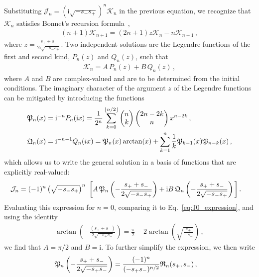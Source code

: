 \documentclass[prd,superscriptaddress,preprintnumbers,tightenlines,nofootinbib, eqsecnum]{revtex4-2}
\newcommand{\di}{\mathrm{i}}
\begin{document}
Substituting $\mathcal{J}_n = \left(\di \sqrt{-s_- s_+}\right)^n \mathcal{K}_n$ in the previous equation, we recognize that $\mathcal{K}_n$ satisfies Bonnet's recursion formula~\cite{Bonnet:these},
\begin{align}
    (n+1) \mathcal{K}_{n+1}= (2n+1) z \mathcal{K}_n - n \mathcal{K}_{n-1} \,,
\end{align}
where $z = \frac{s_+ + s_-}{2\di \sqrt{-s_- s_+}}$. Two independent solutions are the Legendre functions of the first and second kind, $P_n(z)$ and $Q_n(z)$, such that 
\begin{align}
    \mathcal{K}_n  = A \,P_n(z) + B \, Q_n(z) \,,
\end{align}
where $A$ and $B$ are complex-valued and are to be determined from the initial conditions. The imaginary character of the argument $z$ of the Legendre functions can be mitigated by introducing the functions
\begin{align}
    \frak{P}_n(x) &= \di^{-n} P_n(\di x) = \frac{1}{2^n} \sum_{k=0}^{\lfloor n/2 \rfloor} \begin{pmatrix}
        n\\k
    \end{pmatrix} \begin{pmatrix}
        2n-2k\\n
    \end{pmatrix}
    x^{n-2k} \,,\\
    \frak{Q}_n(x) &= \di^{-n-1} Q_n(ix) = \frak{P}_n(x) \arctan(x) + \sum_{k=1}^{n} \frac{1}{k} \frak{P}_{k-1}(x) \frak{P}_{n-k}(x) \,,
\end{align}
which allows us to write the general solution in a basis of functions that are explicitly real-valued:
\begin{align}\label{eq:cal_Jn_of_frak_Pn_Qn}
    \mathcal{J}_n &= (-1)^n\left( \sqrt{-s_- s_+}\right)^n\ \bigg[A \,    \frak{P}_n\left(- \frac{s_+ + s_-}{2 \sqrt{-s_- s_+}} \right)+ \di B \,   \frak{Q}_n\left(- \frac{s_+ + s_-}{2 \sqrt{-s_- s_+}} \right)\bigg] \,.
\end{align}
Evaluating this expression for $n=0$, comparing it to Eq.~\eqref{eq:J0_expression}, and using the identity
\begin{align}\label{eq:arctan_identity}
    \arctan\left(-\frac{(s_+ + s_-)}{2\sqrt{-s_+ s_-}}\right) = \frac{\pi}{2} - 2 \arctan\left(\sqrt{\frac{s_+}{-s_-}}\right) \,,
\end{align}
we find that 
$A = \pi/2$ and $B=\di $. To further simplify the expression, we then write
\begin{align}\label{eq:frak_Pn_of_frak_Rn}
    \frak{P}_n\left(- \frac{s_+ + s_-}{2\sqrt{-s_+ s_-}}\right) & = \frac{(-1)^n}{(-s_+ s_-)^{n/2}}  \frak{R}_n(s_+,s_-) \,,
\end{align}
\end{document}
